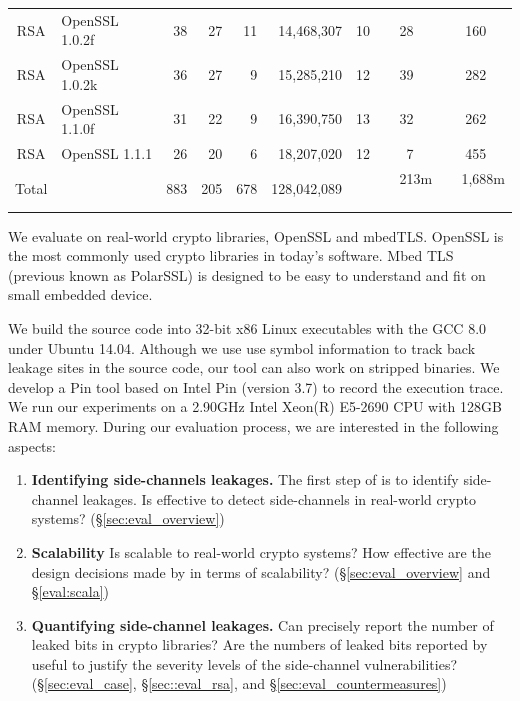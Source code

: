 \begin{table}
\begin{tabular}{clrrrrrrr}
        RSA                & OpenSSL 1.0.2f           & 38                    & 27                  & 11                   & 14,468,307  & 10   & 28 ~~      & 160  ~~         \\
        RSA                & OpenSSL 1.0.2k           & 36                    & 27                  & 9                    & 15,285,210  & 12   & 39 ~~      & 282   ~~        \\
        RSA                & OpenSSL 1.1.0f           & 31                    & 22                  & 9                    & 16,390,750  & 13   & 32 ~~      & 262 ~~          \\
        RSA                & OpenSSL 1.1.1            & 26                    & 20                  & 6                    & 18,207,020  & 12   & 7 ~~       & 455 ~~          \\\hline
        Total              &                          & 883                   & 205                 & 678                  & 128,042,089 &      & 213m    ~~ & 1,688m ~~       \\\hline
    \end{tabular}
\end{table}

We evaluate \tool{} on real-world crypto libraries, OpenSSL and mbedTLS. OpenSSL
is the most commonly used crypto libraries in today's software. Mbed TLS
(previous known as PolarSSL) is designed to be easy to understand and fit on
small embedded device.


We build the source code into 32-bit x86 Linux executables with the GCC 8.0
under Ubuntu 14.04. Although we use use symbol information to track back leakage
sites in the source code, our tool can also work on stripped binaries. We
develop a Pin tool based on Intel Pin (version 3.7) to record the execution
trace. We run our experiments on a 2.90GHz Intel Xeon(R) E5-2690 CPU with 128GB
RAM memory. During our evaluation process, we are interested in the following
aspects:
\begin{enumerate}
    \item  \textbf{Identifying side-channels leakages.}
          The first step of \tool{} is to identify side-channel leakages. Is
          \tool{} effective to detect side-channels in real-world crypto
          systems? (\S\ref{sec:eval_overview})
    \item  \textbf{Scalability}
          Is \tool{} scalable to real-world crypto systems? How effective are
          the design decisions made by \tool{} in terms of scalability?
          (\S\ref{sec:eval_overview} and \S\ref{eval:scala})
    \item  \textbf{Quantifying side-channel leakages.}
          Can \tool{} precisely report the number of leaked bits in crypto
          libraries? Are the numbers of leaked bits reported by \tool{} useful
          to justify the severity levels of the side-channel vulnerabilities?
          (\S\ref{sec:eval_case}, \S\ref{sec::eval_rsa}, and \S\ref{sec:eval_countermeasures})
\end{enumerate}


